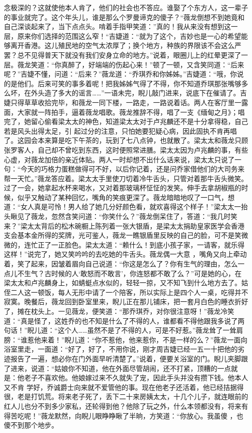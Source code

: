 \documentclass{article}
\begin{document}
\newpage
念极深的？这就使他本人肯了，他们的社会也不答应。谁娶了个东方人，这一辈子的事业就完了。这个年头儿，谁是那么个罗曼谛克的傻子？“薇龙倒想不到她竟和自己深谈起来了，当下点点头。啃着手指甲笑道：”真的！我从来没有想到这一层，原来你们选择的范围这么窄！“吉婕道：“就为了这个，吉妙也是一心的希望能够离开香港。这儿殖民地的空气太浓厚了；换个地方，种族的界限该不会这么严罢？总不见得普天下就没有我们安身立命的地方。”说着，眼圈儿上的红晕更深了一层。薇龙笑道：“你真醉了，好端端的伤起心来！”顿了一顿，又含笑同道：“后来呢？”吉婕不懂，问道：“后来？”薇龙道：“乔琪乔和你姊姊。”吉婕道：“哦，你说的是他们。后来可笑的事多着呢！把我姊姊气得了不得，你不知道乔琪那张嘴够多么坏，在外头造了多大的谣言……”一语未完，睨儿敲门进来，说底下在催请了。吉婕只得草草收拾完毕，和薇龙一同下楼，一路走，一路说着话。两人在客厅里一露面，大家就一阵拍手，逼着薇龙唱歌。薇龙推辞不得，唱了一支《缅甸之月》；唱完了，她留心偷看梁太太的神色，知道梁太太对于卢兆麟还不是十分拿得稳，自己若是风头出得太足，引
\newpage
起过分的注意，只怕她要犯疑心病，因此固执不肯再唱了。这园会本来算是吃下午茶的，玩到了七八点钟，也就散了。梁太太和薇龙只顾张罗客人，自己却不曾吃到东西，这时便照常进膳。梁太太因为卢兆麟的事，有些心虚，对薇龙加倍的亲近体贴。两人一时却想不出什么话来说，梁太太只说了一句：“今天的巧格力蛋糕做得可不好，以后你记着，还是问乔家借他们的大司务来帮一天忙。”薇龙答应着。梁太太手里使刀切着冷牛舌头，只管对着那牛舌头微笑。过了一会，她拿起水杯来喝水，又对着那玻璃杯怔怔的发笑。伸手去拿胡椒瓶的时候，似乎又触动了某种回忆，嘴角的笑痕更深了。薇龙暗暗地叹了一口气，想道：“女人真是可怜！男人给了她几分好颜色看，就欢喜得这个样子！”梁太太一抬头瞅见了薇龙，忽然含笑问道：“你笑什么？”薇龙倒呆住了，答道：“我几时笑来？”梁太太背后的松木碗橱上陈列着一张大银盾，是梁太太捐助皇家医学会香港支会基本金所得的奖牌，光可鉴人，薇龙一瞧银盾里反映的自己的脸，可不是笑微微的，连忙正了一正脸色。梁太太道：“赖什么！到底小孩子家，一请客，就乐得这样！”说完了，她又笑吟吟的去吃她的牛舌头。薇龙偶一大意
\newpage
，嘴角又向上牵动着，笑了起来，因皱着眉向自己说道：“你这是怎么了？你有生气的理由，怎么一点儿不生气？古时候的人‘敢怒而不敢言’，你连怒都不敢了么？”可是她的心，在梁太太和卢兆麟身上，如蜻蜓点水似的，轻轻一掠，又不知飞到什么地方去了。姑侄二人这一顿饭，每人无形中请了一个陪客，所以实际上是四个人一桌，吃得并不寂寞。晚餐后，薇龙回到卧室里来，睨儿正在那儿铺床，把一套月白色的睡衣折好了，摊在枕头上。一见薇龙，便笑道：“那乔琪乔，对你很注意呀！”薇龙冷笑道：“真是怪了，这姓乔的也不知是什么了不得的人，谁都看不得他跟我多说了两句话！”睨儿道：“这个人……虽然不是了不得的人，可是不好惹。”薇龙耸了一耸肩膀：“谁惹他来着！”睨儿道：“你不惹他，他来惹你，不是一样的么？”薇龙一面向浴室里走，一面道：“好了，好了，不用你说，刚才周吉婕已经一五一十把他的劣迹报告了一遍，想必你在门外面早听清楚了。”说着，便要关浴室的门。睨儿夹脚跟了进来，说道：“姑娘你不知道，他在外面尽管胡闹，还不打紧，顶糟的一点就是：他老子不喜欢他。他娘嫁过来不久就失了宠，因此手头并没有攒下钱。他本人又不肯
\newpage
学好，乔诚爵士向来就不爱管他的事。现在他老子还活着，他已经拮据得很，老是打饥荒。将来老子死了，丢下二十来房姨太太，十几个儿子，就连眼前的红人儿也分不到多少家私，还轮得到他？他除了玩之外，什么本领都没有，将来有得苦吃呢！”薇龙默然，向睨儿眼睁睁瞅了半晌，方笑道：“你放心。我虽傻
，也傻不到那个地步。 
\end{document}

